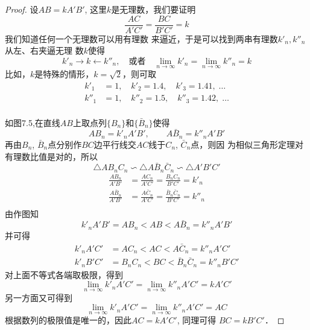 \begin{proof}
设$AB=kA'B'$, 这里$k$是无理数，我们要证明
\[\frac{AC}{A'C'}=\frac{BC}{B'C'}=k\]
我们知道任何一个无理数可以用有理数
来逼近，于是可以找到两串有理数$k'_n,k''_n$从左、右夹逼无理
数$k$使得
\[k'_n\to k\leftarrow k''_n,\quad \text{或者}\quad \lim_{n\to\infty}k'_n=\lim_{n\to\infty}k''_n=k\]
比如，$k$是特殊的情形，$k=\sqrt{2}$，则可取
\[\begin{split}
    k'_1&=1,\quad     k'_2=1.4,\quad    k'_3=1.41,\;\ldots\\ 
    k''_1&=1,\quad     k''_2=1.5,\quad    k''_3=1.42,\;\ldots\\
\end{split}\]

\begin{figure}[htp]
    \centering
{}
    \caption{}
\end{figure}

如图7.5,在直线$AB$上取点列$\{B_n\}$和$\{\bar{B}_n\}$使得
\[AB_n=k'_nA'B',\qquad A\bar{B}_n=k''_n A'B'\]
再由$B_n$, $\bar{B}_n$点分别作$BC$边平行线交$AC$线于$C_n$, $\bar{C}_n$点，则因
为相似三角形定理对有理数比值是对的，所以
\[\triangle AB_nC_n\backsim \triangle A\bar{B}_n\bar{C}_n\backsim \triangle A'B'C'\]
\[\begin{split}
    \frac{AB_n}{A'B'}&=\frac{AC_n}{A'C'}=\frac{B_nC_n}{B'C'}=k'_n\\
    \frac{A\bar{B}_n}{A'B'}&=\frac{A\bar{C}_n}{A'C'}=\frac{\bar{B}_n\bar{C}_n}{B'C'}=k''_n\\
\end{split}\]
由作图知
\[k'_nA'B'=AB_n<AB<A\bar{B}_n=k''_nA'B'\]
并可得
\[\begin{split}
     k'_nA'C'&=AC_n<AC<A\bar{C}_n=k''_nA'C'\\
k'_nB'C'&=B_nC_n<BC<\bar{B}_n\bar{C}_n=k''_nB'C'
\end{split}\]
对上面不等式各端取极限，得到
\[\lim_{n\to\infty} k'_n A'C'  =  \lim_{n\to\infty}k''_n A'C'   =kA'C'\]
另一方面又可得到
\[\lim_{n\to\infty} k'_n A'C' = \lim_{n\to\infty}k''_n A'C'  =AC\]
根据数列的极限值是唯一的，因此$AC=kA'C'$, 同理可得
$BC=kB'C'$．
\end{proof}

